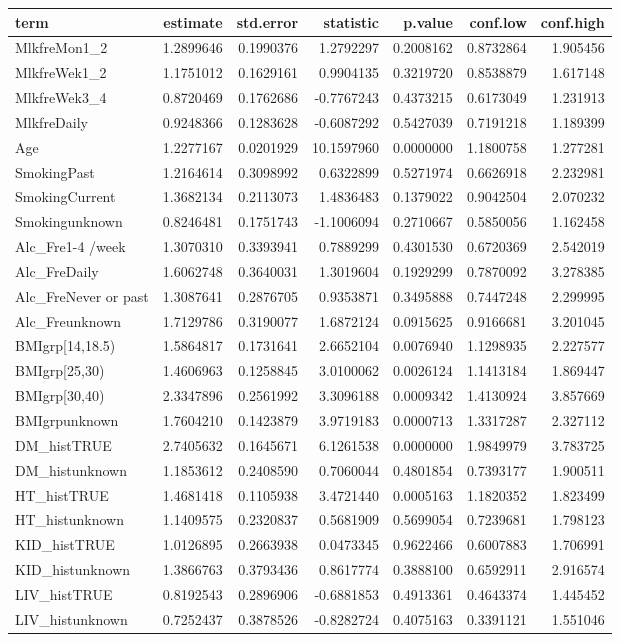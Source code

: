 \documentclass[]{article}
\begin{document}
\begin{longtable}[]{@{}lrrrrrr@{}}
\toprule
term & estimate & std.error & statistic & p.value & conf.low &
conf.high\tabularnewline
\midrule
\endhead
MlkfreMon1\_2 & 1.2899646 & 0.1990376 & 1.2792297 & 0.2008162 &
0.8732864 & 1.905456\tabularnewline
MlkfreWek1\_2 & 1.1751012 & 0.1629161 & 0.9904135 & 0.3219720 &
0.8538879 & 1.617148\tabularnewline
MlkfreWek3\_4 & 0.8720469 & 0.1762686 & -0.7767243 & 0.4373215 &
0.6173049 & 1.231913\tabularnewline
MlkfreDaily & 0.9248366 & 0.1283628 & -0.6087292 & 0.5427039 & 0.7191218
& 1.189399\tabularnewline
Age & 1.2277167 & 0.0201929 & 10.1597960 & 0.0000000 & 1.1800758 &
1.277281\tabularnewline
SmokingPast & 1.2164614 & 0.3098992 & 0.6322899 & 0.5271974 & 0.6626918
& 2.232981\tabularnewline
SmokingCurrent & 1.3682134 & 0.2113073 & 1.4836483 & 0.1379022 &
0.9042504 & 2.070232\tabularnewline
Smokingunknown & 0.8246481 & 0.1751743 & -1.1006094 & 0.2710667 &
0.5850056 & 1.162458\tabularnewline
Alc\_Fre1-4 /week & 1.3070310 & 0.3393941 & 0.7889299 & 0.4301530 &
0.6720369 & 2.542019\tabularnewline
Alc\_FreDaily & 1.6062748 & 0.3640031 & 1.3019604 & 0.1929299 &
0.7870092 & 3.278385\tabularnewline
Alc\_FreNever or past & 1.3087641 & 0.2876705 & 0.9353871 & 0.3495888 &
0.7447248 & 2.299995\tabularnewline
Alc\_Freunknown & 1.7129786 & 0.3190077 & 1.6872124 & 0.0915625 &
0.9166681 & 3.201045\tabularnewline
BMIgrp{[}14,18.5) & 1.5864817 & 0.1731641 & 2.6652104 & 0.0076940 &
1.1298935 & 2.227577\tabularnewline
BMIgrp{[}25,30) & 1.4606963 & 0.1258845 & 3.0100062 & 0.0026124 &
1.1413184 & 1.869447\tabularnewline
BMIgrp{[}30,40) & 2.3347896 & 0.2561992 & 3.3096188 & 0.0009342 &
1.4130924 & 3.857669\tabularnewline
BMIgrpunknown & 1.7604210 & 0.1423879 & 3.9719183 & 0.0000713 &
1.3317287 & 2.327112\tabularnewline
DM\_histTRUE & 2.7405632 & 0.1645671 & 6.1261538 & 0.0000000 & 1.9849979
& 3.783725\tabularnewline
DM\_histunknown & 1.1853612 & 0.2408590 & 0.7060044 & 0.4801854 &
0.7393177 & 1.900511\tabularnewline
HT\_histTRUE & 1.4681418 & 0.1105938 & 3.4721440 & 0.0005163 & 1.1820352
& 1.823499\tabularnewline
HT\_histunknown & 1.1409575 & 0.2320837 & 0.5681909 & 0.5699054 &
0.7239681 & 1.798123\tabularnewline
KID\_histTRUE & 1.0126895 & 0.2663938 & 0.0473345 & 0.9622466 &
0.6007883 & 1.706991\tabularnewline
KID\_histunknown & 1.3866763 & 0.3793436 & 0.8617774 & 0.3888100 &
0.6592911 & 2.916574\tabularnewline
LIV\_histTRUE & 0.8192543 & 0.2896906 & -0.6881853 & 0.4913361 &
0.4643374 & 1.445452\tabularnewline
LIV\_histunknown & 0.7252437 & 0.3878526 & -0.8282724 & 0.4075163 &
0.3391121 & 1.551046\tabularnewline

\end{longtable}
\end{document}
